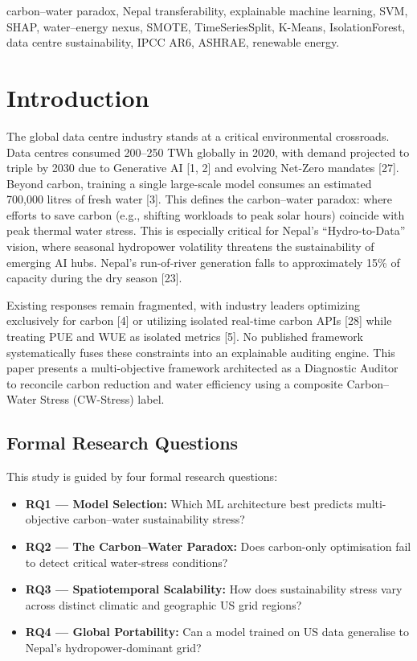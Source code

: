 \documentclass[conference]{IEEEtran}
\begin{document}
\begin{IEEEkeywords}
carbon–water paradox, Nepal transferability, explainable machine learning, SVM, SHAP, water–energy nexus, SMOTE, TimeSeriesSplit, K-Means, IsolationForest, data centre sustainability, IPCC AR6, ASHRAE, renewable energy.
\end{IEEEkeywords}

\section{Introduction}
The global data centre industry stands at a critical environmental crossroads. Data centres consumed 200–250 TWh globally in 2020, with demand projected to triple by 2030 due to Generative AI [1, 2] and evolving Net-Zero mandates [27]. Beyond carbon, training a single large-scale model consumes an estimated 700,000 litres of fresh water [3]. This defines the carbon–water paradox: where efforts to save carbon (e.g., shifting workloads to peak solar hours) coincide with peak thermal water stress. This is especially critical for Nepal's ``Hydro-to-Data'' vision, where seasonal hydropower volatility threatens the sustainability of emerging AI hubs. Nepal's run-of-river generation falls to approximately 15\% of capacity during the dry season [23].

Existing responses remain fragmented, with industry leaders optimizing exclusively for carbon [4] or utilizing isolated real-time carbon APIs [28] while treating PUE and WUE as isolated metrics [5]. No published framework systematically fuses these constraints into an explainable auditing engine. This paper presents a multi-objective framework architected as a Diagnostic Auditor to reconcile carbon reduction and water efficiency using a composite Carbon–Water Stress (CW-Stress) label.



\subsection{Formal Research Questions}
This study is guided by four formal research questions:
\begin{itemize}
    \item \textbf{RQ1 — Model Selection:} Which ML architecture best predicts multi-objective carbon–water sustainability stress?
    \item \textbf{RQ2 — The Carbon–Water Paradox:} Does carbon-only optimisation fail to detect critical water-stress conditions?
    \item \textbf{RQ3 — Spatiotemporal Scalability:} How does sustainability stress vary across distinct climatic and geographic US grid regions?
    \item \textbf{RQ4 — Global Portability:} Can a model trained on US data generalise to Nepal's hydropower-dominant grid?
\end{itemize}
\end{document}
